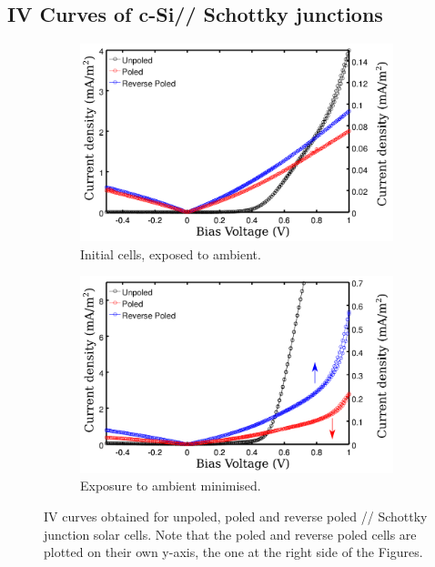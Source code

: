 \subsection{IV Curves of c-Si/\pvdf{}/\pdot{} Schottky junctions}
\begin{figure}
\begin{subfigure}{1\textwidth}
\centering
	\includegraphics[width=0.9\linewidth]{./figs/chap1/IV1}
	\caption{Initial cells, exposed to ambient.}
	\label{fig:iv1}
\end{subfigure}
\vspace{30pt}
\begin{subfigure}{1\textwidth}
\centering
	\includegraphics[width=0.9\linewidth]{./figs/chap1/IV2}
	\caption{Exposure to ambient minimised.}
	\label{fig:iv2}
\end{subfigure}
\caption[IV curves obtained for unpoled, poled and reverse poled \sih{}/\pvdf{}/ \pdot{} Schottky junction solar cells.]{IV curves obtained for unpoled, poled and reverse poled \sih{}/\pvdf{}/\pdot{} Schottky junction solar cells. Note that the poled and reverse poled cells are plotted on their own y-axis, the one at the right side of the Figures.}
\label{fig:iv}
\end{figure}
